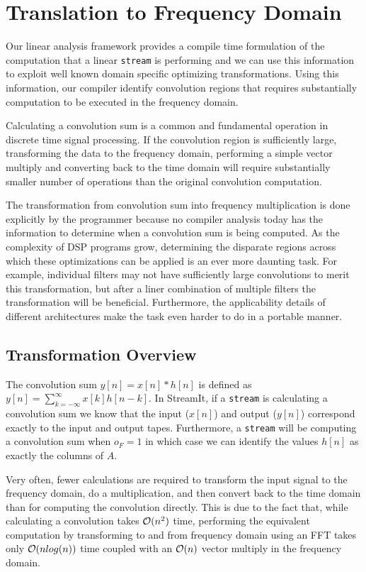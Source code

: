 
\section{Translation to Frequency Domain}

Our linear analysis framework provides a compile time formulation of
the computation that a linear {\tt stream} is performing and we can
use this information to exploit well known domain specific optimizing
transformations.  Using this information, our compiler identify
convolution regions that requires substantially computation to be
executed in the frequency domain.

Calculating a convolution sum is a common and fundamental operation in
discrete time signal processing.
If the convolution region is sufficiently large,
transforming the data to the
frequency domain, performing a simple vector multiply and converting
back to the time domain will require substantially smaller number of
operations than the original convolution computation.

The transformation from convolution sum into frequency multiplication
is done explicitly by the programmer because no compiler analysis today
has the information to determine when a convolution sum is being
computed.  As the complexity of DSP programs grow, determining the
disparate regions across which these optimizations can be applied is
an ever more daunting task. For example, individual filters may not
have sufficiently large convolutions to merit this transformation, but
after a liner combination of multiple filters the transformation will
be beneficial.  Furthermore, the applicability details of different
architectures make the task even harder to do in a portable manner.

\subsection{Transformation Overview}
The convolution sum $y[n]=x[n]*h[n]$ is defined 
as $y[n]=\sum_{k=-\infty}^{\infty}x[k]h[n-k]$.
In StreamIt, if a {\tt stream} is calculating a convolution sum we know that 
the input ($x[n]$) and output ($y[n]$) correspond exactly to the input and output tapes. 
Furthermore, a {\tt stream} will be computing a convolution sum when $o_F=1$ in which
case we can identify the values $h[n]$ as exactly the columns of $A$.

Very often, fewer calculations are required to transform the input
signal to the frequency domain, do a multiplication, and then convert
back to the time domain than for computing the convolution
directly. This is due to the fact that, while calculating a
convolution takes ${\cal O}(n^2)$ time, performing the equivalent
computation by transforming to and from frequency domain using an FFT
takes only ${\cal O}(n log(n))$ time coupled with an ${\cal O}(n)$
vector multiply in the frequency domain.

